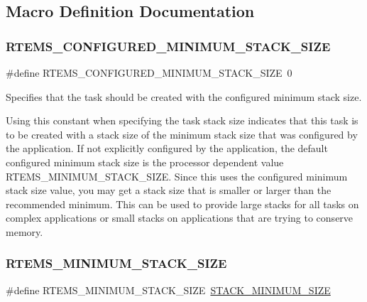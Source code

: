 \subsection{Macro Definition Documentation}
\mbox{\label{group__RTEMSAPIClassic_gaf0e9e3aff09f933ed7dbbbfd2c55f0f2}} 
\subsubsection{\texorpdfstring{RTEMS\_CONFIGURED\_MINIMUM\_STACK\_SIZE}{RTEMS\_CONFIGURED\_MINIMUM\_STACK\_SIZE}}
{\footnotesize\ttfamily \#define R\+T\+E\+M\+S\+\_\+\+C\+O\+N\+F\+I\+G\+U\+R\+E\+D\+\_\+\+M\+I\+N\+I\+M\+U\+M\+\_\+\+S\+T\+A\+C\+K\+\_\+\+S\+I\+ZE~0}



Specifies that the task should be created with the configured minimum stack size. 

Using this constant when specifying the task stack size indicates that this task is to be created with a stack size of the minimum stack size that was configured by the application. If not explicitly configured by the application, the default configured minimum stack size is the processor dependent value R\+T\+E\+M\+S\+\_\+\+M\+I\+N\+I\+M\+U\+M\+\_\+\+S\+T\+A\+C\+K\+\_\+\+S\+I\+ZE. Since this uses the configured minimum stack size value, you may get a stack size that is smaller or larger than the recommended minimum. This can be used to provide large stacks for all tasks on complex applications or small stacks on applications that are trying to conserve memory. \mbox{\label{group__RTEMSAPIClassic_ga2e35188053c5e97a85df8e3aa4d23d2f}} 
\subsubsection{\texorpdfstring{RTEMS\_MINIMUM\_STACK\_SIZE}{RTEMS\_MINIMUM\_STACK\_SIZE}}
{\footnotesize\ttfamily \#define R\+T\+E\+M\+S\+\_\+\+M\+I\+N\+I\+M\+U\+M\+\_\+\+S\+T\+A\+C\+K\+\_\+\+S\+I\+ZE~\mbox{\hyperlink{group__RTEMSScoreStack_gaef3654e2c6c9afbd5dbe22b84fc22fc5}{S\+T\+A\+C\+K\+\_\+\+M\+I\+N\+I\+M\+U\+M\+\_\+\+S\+I\+ZE}}}



